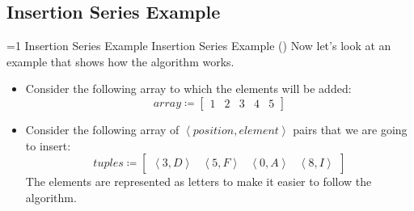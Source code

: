     \subsection{Insertion Series Example}
\setcounter{insertionseriesexamplecounter}{1}
\newcommand{\insertionseriesexampleframe}{%
    \ifnum\value{insertionseriesexamplecounter}=1
        Insertion Series Example%
    \else
        Insertion Series Example (\theinsertionseriesexamplecounter)%
    \fi
}
        \begin{frame}{\insertionseriesexampleframe}
            Now let's look at an example that shows how the algorithm works.

            \begin{itemize}
                \item Consider the following array to which the elements will be added:
                \begin{equation*}
                    array \coloneqq \begin{bmatrix}
                        1 & 2 & 3 & 4 & 5
                    \end{bmatrix}
                \end{equation*}
                
                \item Consider the following array of $\left<position, element\right>$ pairs that we are going to insert:
                \begin{equation*}
                    tuples \coloneqq \begin{bmatrix}
                        \left<3, D\right> & \left<5, F\right> & \left<0, A\right> & \left<8, I\right>
                    \end{bmatrix}
                \end{equation*}
                The elements are represented as letters to make it easier to follow the algorithm.
            \end{itemize}
        \end{frame}

